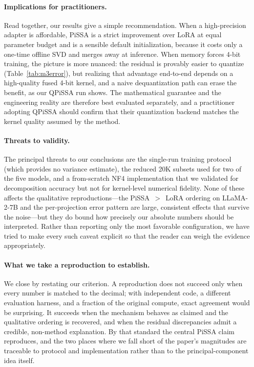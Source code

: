 \documentclass[mlmain]{jmlr}
\begin{document}
\paragraph{Implications for practitioners.} Read together, our results give a simple recommendation. When a high-precision adapter is affordable, PiSSA is a strict improvement over LoRA at equal parameter budget and is a sensible default initialization, because it costs only a one-time offline SVD and merges away at inference. When memory forces 4-bit training, the picture is more nuanced: the residual is provably easier to quantize (Table~\ref{tab:m3error}), but realizing that advantage end-to-end depends on a high-quality fused 4-bit kernel, and a naive dequantization path can erase the benefit, as our QPiSSA run shows. The mathematical guarantee and the engineering reality are therefore best evaluated separately, and a practitioner adopting QPiSSA should confirm that their quantization backend matches the kernel quality assumed by the method.

\paragraph{Threats to validity.} The principal threats to our conclusions are the single-run training protocol (which provides no variance estimate), the reduced 20K subsets used for two of the five models, and a from-scratch NF4 implementation that we validated for decomposition accuracy but not for kernel-level numerical fidelity. None of these affects the qualitative reproductions---the PiSSA~$>$~LoRA ordering on LLaMA-2-7B and the per-projection error pattern are large, consistent effects that survive the noise---but they do bound how precisely our absolute numbers should be interpreted. Rather than reporting only the most favorable configuration, we have tried to make every such caveat explicit so that the reader can weigh the evidence appropriately.

\paragraph{What we take a reproduction to establish.} We close by restating our criterion. A reproduction does not succeed only when every number is matched to the decimal; with independent code, a different evaluation harness, and a fraction of the original compute, exact agreement would be surprising. It succeeds when the mechanism behaves as claimed and the qualitative ordering is recovered, and when the residual discrepancies admit a credible, non-method explanation. By that standard the central PiSSA claim reproduces, and the two places where we fall short of the paper's magnitudes are traceable to protocol and implementation rather than to the principal-component idea itself.
\end{document}
